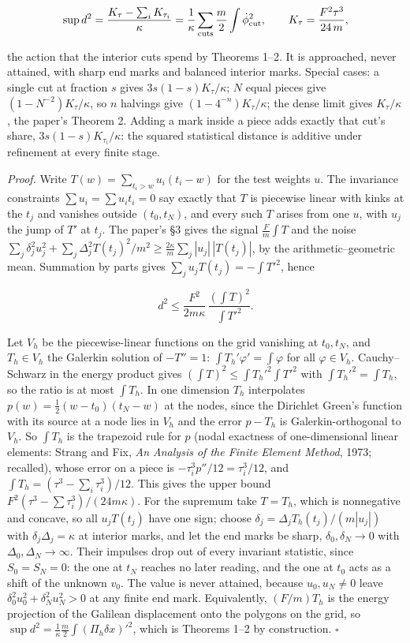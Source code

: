 \documentclass[11pt,a4paper]{article}
\begin{document}
\[\sup d^2=\frac{K_\tau-\sum_iK_{\tau_i}}{\kappa}=\frac1\kappa\sum_{\rm cuts}\frac m2\int\dot\phi_{\rm cut}^2,
\qquad K_\tau=\frac{F^2\tau^3}{24\,m},\]

the action that the interior cuts spend by Theorems 1--2. It is
approached, never attained, with sharp end marks and balanced interior
marks. Special cases: a single cut at fraction \(s\) gives
\(3s(1-s)K_\tau/\kappa\); \(N\) equal pieces give
\((1-N^{-2})K_\tau/\kappa\), so \(n\) halvings give
\((1-4^{-n})K_\tau/\kappa\); the dense limit gives \(K_\tau/\kappa\),
the paper's Theorem 2. Adding a mark inside a piece adds exactly that
cut's share, \(3s(1-s)K_{\tau_i}/\kappa\): the squared statistical
distance is additive under refinement at every finite stage.

\emph{Proof.} Write \(T(w)=\sum_{t_i>w}u_i(t_i-w)\) for the test weights
\(u\). The invariance constraints \(\sum u_i=\sum u_it_i=0\) say exactly
that \(T\) is piecewise linear with kinks at the \(t_j\) and vanishes
outside \((t_0,t_N)\), and every such \(T\) arises from one \(u\), with
\(u_j\) the jump of \(T'\) at \(t_j\). The paper's §3 gives the signal
\(\frac Fm\int T\) and the noise
\(\sum_j\delta_j^2u_j^2+\sum_j\Delta_j^2T(t_j)^2/m^2\ge\frac{2\kappa}m\sum_j|u_j|\,|T(t_j)|\),
by the arithmetic--geometric mean. Summation by parts gives
\(\sum_ju_jT(t_j)=-\int T'^2\), hence

\[d^2\le\frac{F^2}{2m\kappa}\,\frac{(\int T)^2}{\int T'^2}.\]

Let \(V_h\) be the piecewise-linear functions on the grid vanishing at
\(t_0,t_N\), and \(T_h\in V_h\) the Galerkin solution of \(-T''=1\):
\(\int T_h'\varphi'=\int\varphi\) for all \(\varphi\in V_h\).
Cauchy--Schwarz in the energy product gives
\((\int T)^2\le\int T_h'^2\int T'^2\) with \(\int T_h'^2=\int T_h\), so
the ratio is at most \(\int T_h\). In one dimension \(T_h\) interpolates
\(p(w)=\frac12(w-t_0)(t_N-w)\) at the nodes, since the Dirichlet Green's
function with its source at a node lies in \(V_h\) and the error
\(p-T_h\) is Galerkin-orthogonal to \(V_h\). So \(\int T_h\) is the
trapezoid rule for \(p\) (nodal exactness of one-dimensional linear
elements: Strang and Fix, \emph{An Analysis of the Finite Element
Method}, 1973; recalled), whose error on a piece is
\(-\tau_i^3p''/12=\tau_i^3/12\), and
\(\int T_h=(\tau^3-\sum_i\tau_i^3)/12\). This gives the upper bound
\(F^2(\tau^3-\sum\tau_i^3)/(24m\kappa)\). For the supremum take
\(T=T_h\), which is nonnegative and concave, so all \(u_jT(t_j)\) have
one sign; choose \(\delta_j=\Delta_jT_h(t_j)/(m|u_j|)\) with
\(\delta_j\Delta_j=\kappa\) at interior marks, and let the end marks be
sharp, \(\delta_0,\delta_N\to0\) with \(\Delta_0,\Delta_N\to\infty\).
Their impulses drop out of every invariant statistic, since
\(S_0=S_N=0\): the one at \(t_N\) reaches no later reading, and the one
at \(t_0\) acts as a shift of the unknown \(v_0\). The value is never
attained, because \(u_0,u_N\ne0\) leave
\(\delta_0^2u_0^2+\delta_N^2u_N^2>0\) at any finite end mark.
Equivalently, \((F/m)T_h\) is the energy projection of the Galilean
displacement onto the polygons on the grid, so
\(\sup d^2=\frac1\kappa\frac m2\int(\Pi_h\delta x)'^2\), which is
Theorems 1--2 by construction. \(\square\)
\end{document}
